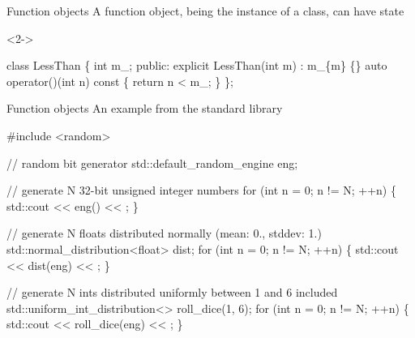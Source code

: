 \begin{frame}[fragile]{Function objects \insertcontinuationtext}
  A function object, being the instance of a class, can have state
  \begin{codeblock}<2->{
class LessThan \{
  \alert<2>{int m\_;}
 public:
  explicit \alert<2>{LessThan(int m) : m\_\{m\} \{\}}
  auto operator()(int n) const \{
    return n < m_;
  \}
\};


}\end{codeblock}

\end{frame}

\begin{frame}[fragile]{Function objects \insertcontinuationtext}
  An example from the standard library

  \begin{codeblock}
#include <random>

// random bit generator
std::default_random_engine eng;

// generate N 32-bit unsigned integer numbers
for (int n = 0; n != N; ++n) \{
  std::cout <{}< \alert{eng()} <{}< \bslashn;
\}

// generate N floats distributed normally (mean: 0., stddev: 1.)
std::normal\_distribution<float> dist;
for (int n = 0; n != N; ++n) \{
  std::cout <{}< \alert{dist(eng)} <{}< \bslashn;
\}

// generate N ints distributed uniformly between 1 and 6 included
std::uniform\_int\_distribution<> roll\_dice(1, 6);
for (int n = 0; n != N; ++n) \{
  std::cout <{}< \alert{roll\_dice(eng)} <{}< \bslashn;
\}\end{codeblock}

\end{frame}

